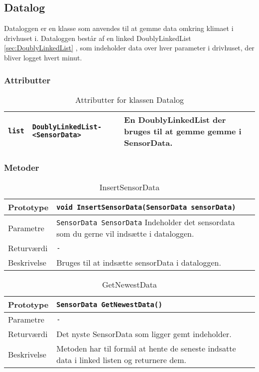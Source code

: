 \subsection{Datalog}

Dataloggen er en klasse som anvendes til at gemme data omkring klimaet i drivhuset i. Dataloggen består af en linked DoublyLinkedList \ref{sec:DoublyLinkedList} , som indeholder data over hver parameter i drivhuset, der bliver logget hvert minut.

\subsubsection{Attributter}

\begin{table}[h]
\begin{tabularx}{\textwidth}{| L{2.5 cm} | l | Z |} \hline
\texttt{list} & \texttt{DoublyLinkedList- <SensorData>} & En DoublyLinkedList der bruges til at gemme gemme i SensorData. \\\hline
\end{tabularx}
\caption{Attributter for klassen Datalog}
\label{table:Datalog_attributter}
\end{table}

\subsubsection{Metoder}

\begin{table}[h]
\begin{tabularx}{\textwidth}{| L{2.5 cm} | Z |} \hline
Prototype & \texttt{void InsertSensorData(SensorData sensorData)} \\\hline
Parametre & \texttt{SensorData SensorData} \newline
Indeholder det sensordata som du gerne vil indsætte i dataloggen. \\\hline
Returværdi & \texttt{-} \\\hline
Beskrivelse & Bruges til at indsætte sensorData i dataloggen. \\\hline
\end{tabularx}
\caption{InsertSensorData}
\label{table:Datalog_InsertSensorData}
\end{table}


\begin{table}[h]
\begin{tabularx}{\textwidth}{| L{2.5 cm} | Z |} \hline
Prototype & \texttt{SensorData GetNewestData()} \\\hline
Parametre & \texttt{-}\\\hline
Returværdi & Det nyste SensorData som  ligger gemt indeholder. \\\hline
Beskrivelse & Metoden har til formål at hente de seneste indsatte data i linked listen og returnere dem. \\\hline
\end{tabularx}
\caption{GetNewestData}
\label{table:Datalog_GetNewestData}
\end{table}


